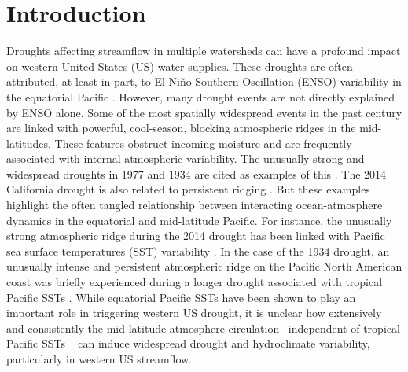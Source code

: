 \documentclass[final, double]{ua-thesis}
\begin{document}
\section{Introduction}

Droughts affecting streamflow in multiple watersheds can have a profound impact on western United States (US) water supplies. These droughts are often attributed, at least in part, to El Ni\~no-Southern Oscillation (ENSO) variability in the equatorial Pacific \citep{1cayan_enso_1999, 1dettinger_northsouth_1998, 1redmond_surface_1991, 1seager_atmosphere_2014, 1wise_cool-season_2014}. However, many drought events are not directly explained by ENSO alone. Some of the most spatially widespread events in the past century are linked with powerful, cool-season, blocking atmospheric ridges in the mid-latitudes. These features obstruct incoming moisture and are frequently associated with internal atmospheric variability. The unusually strong and widespread droughts in 1977 and 1934 are cited as examples of this \citep [e.g., ][]{1cook_worst_2014, 1hoerling_distinct_2009, 1seager_causes_2014, 1diaz_recent_2015, 1wise_five_2016}. The 2014 California drought is also related to persistent ridging \citep{1cook_worst_2014, 1seager_causes_2015, 1teng_causes_2016, 1wang_probable_2014}. But these examples highlight the often tangled relationship between interacting ocean-atmosphere dynamics in the equatorial and mid-latitude Pacific. For instance, the unusually strong atmospheric ridge during the 2014 drought has been linked with Pacific sea surface temperatures (SST) variability \citep[e.g., ][]{1herring_explaining_2014, 1seager_causes_2015, 1wang_role_2014, 1seager_causes_2014, 1teng_causes_2016, 1wang_probable_2014, 1hartmann_pacific_2015, 1swain_tale_2015}. In the case of the 1934 drought, an unusually intense and persistent atmospheric ridge on the Pacific North American coast was briefly experienced during a longer drought associated with tropical Pacific SSTs \citep{1cook_worst_2014, 1herring_explaining_2014, 1seager_would_2008, 1seager_modeling_2005, 1schubert_cause_2004}. While equatorial Pacific SSTs have been shown to play an important role in triggering western US drought, it is unclear how extensively and consistently the mid-latitude atmosphere circulation \textemdash~independent of tropical Pacific SSTs \textemdash~ can induce widespread drought and hydroclimate variability, particularly in western US streamflow.
\end{document}
